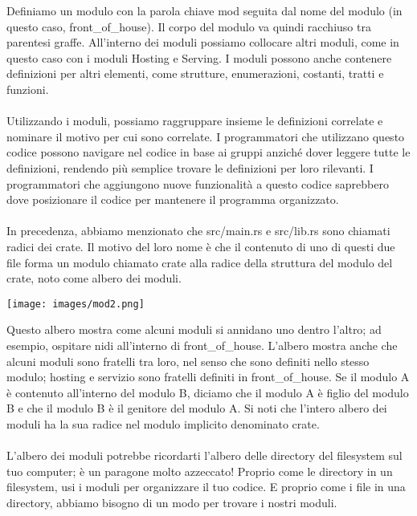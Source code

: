 \documentclass[11pt,a4paper]{article}
\begin{document}
Definiamo un modulo con la parola chiave mod seguita dal nome del modulo (in questo caso, front\_of\_house). Il corpo del modulo va quindi racchiuso tra parentesi graffe. All'interno dei moduli possiamo collocare altri moduli, come in questo caso con i moduli Hosting e Serving. I moduli possono anche contenere definizioni per altri elementi, come strutture, enumerazioni, costanti, tratti e funzioni.\\
\\
Utilizzando i moduli, possiamo raggruppare insieme le definizioni correlate e nominare il motivo per cui sono correlate. I programmatori che utilizzano questo codice possono navigare nel codice in base ai gruppi anziché dover leggere tutte le definizioni, rendendo più semplice trovare le definizioni per loro rilevanti. I programmatori che aggiungono nuove funzionalità a questo codice saprebbero dove posizionare il codice per mantenere il programma organizzato.\\
\\
In precedenza, abbiamo menzionato che src/main.rs e src/lib.rs sono chiamati radici dei crate. Il motivo del loro nome è che il contenuto di uno di questi due file forma un modulo chiamato crate alla radice della struttura del modulo del crate, noto come albero dei moduli.
\begin{center}
\texttt{[image: images/mod2.png]}
\end{center}
Questo albero mostra come alcuni moduli si annidano uno dentro l'altro; ad esempio, ospitare nidi all'interno di front\_of\_house. L'albero mostra anche che alcuni moduli sono fratelli tra loro, nel senso che sono definiti nello stesso modulo; hosting e servizio sono fratelli definiti in front\_of\_house. Se il modulo A è contenuto all'interno del modulo B, diciamo che il modulo A è figlio del modulo B e che il modulo B è il genitore del modulo A. Si noti che l'intero albero dei moduli ha la sua radice nel modulo implicito denominato crate.\\
\\
L'albero dei moduli potrebbe ricordarti l'albero delle directory del filesystem sul tuo computer; è un paragone molto azzeccato! Proprio come le directory in un filesystem, usi i moduli per organizzare il tuo codice. E proprio come i file in una directory, abbiamo bisogno di un modo per trovare i nostri moduli.
\end{document}
